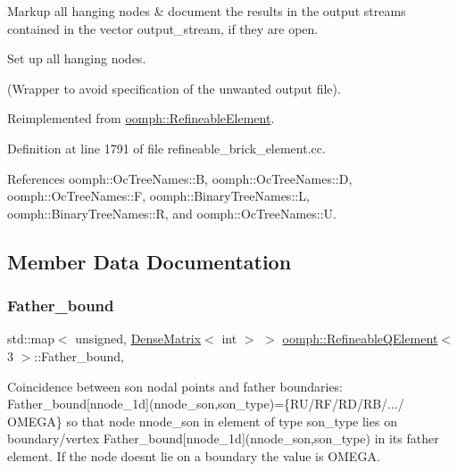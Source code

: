 Markup all hanging nodes \& document the results in the output streams contained in the vector output\+\_\+stream, if they are open. 

Set up all hanging nodes.

(Wrapper to avoid specification of the unwanted output file). 

Reimplemented from \hyperlink{classoomph_1_1RefineableElement_a9368e9ffa7d06a436253d0e23f874d65}{oomph\+::\+Refineable\+Element}.



Definition at line 1791 of file refineable\+\_\+brick\+\_\+element.\+cc.



References oomph\+::\+Oc\+Tree\+Names\+::B, oomph\+::\+Oc\+Tree\+Names\+::D, oomph\+::\+Oc\+Tree\+Names\+::F, oomph\+::\+Binary\+Tree\+Names\+::L, oomph\+::\+Binary\+Tree\+Names\+::R, and oomph\+::\+Oc\+Tree\+Names\+::U.



\subsection{Member Data Documentation}
\mbox{\label{classoomph_1_1RefineableQElement_3_013_01_4_a0c02f69b5f451db97099acb1e2960738}} 
\subsubsection{\texorpdfstring{Father\+\_\+bound}{Father\_bound}}
{\footnotesize\ttfamily std\+::map$<$ unsigned, \hyperlink{classoomph_1_1DenseMatrix}{Dense\+Matrix}$<$ int $>$ $>$ \hyperlink{classoomph_1_1RefineableQElement}{oomph\+::\+Refineable\+Q\+Element}$<$ 3 $>$\+::Father\+\_\+bound\hspace{0.3cm}{\ttfamily [static]}, {\ttfamily [protected]}}



Coincidence between son nodal points and father boundaries\+: Father\+\_\+bound\mbox{[}nnode\+\_\+1d\mbox{]}(nnode\+\_\+son,son\+\_\+type)=\{R\+U/\+R\+F/\+R\+D/\+R\+B/.../ O\+M\+E\+GA\} so that node nnode\+\_\+son in element of type son\+\_\+type lies on boundary/vertex Father\+\_\+bound\mbox{[}nnode\+\_\+1d\mbox{]}(nnode\+\_\+son,son\+\_\+type) in its father element. If the node doesn\textquotesingle{}t lie on a boundary the value is O\+M\+E\+GA. 

